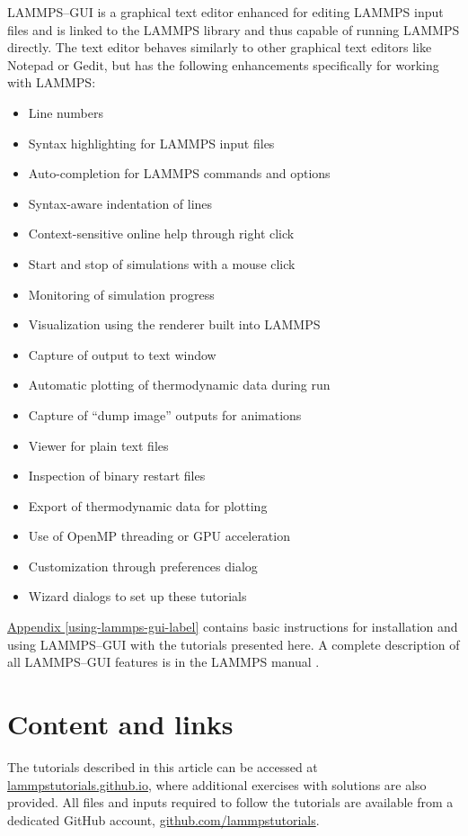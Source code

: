 \documentclass[9pt,tutorial]{livecoms}
\begin{document}
LAMMPS--GUI is a graphical text editor enhanced for editing LAMMPS input
files and is linked to the LAMMPS library and thus capable of running
LAMMPS directly.  The text editor behaves similarly to other graphical
text editors like Notepad or Gedit, but has the following enhancements
specifically for working with LAMMPS:
\begin{itemize}
\item Line numbers
\item Syntax highlighting for LAMMPS input files
\item Auto-completion for LAMMPS commands and options
\item Syntax-aware indentation of lines
\item Context-sensitive online help through right click
\item Start and stop of simulations with a mouse click
\item Monitoring of simulation progress
\item Visualization using the renderer built into LAMMPS
\item Capture of output to text window
\item Automatic plotting of thermodynamic data during run
\item Capture of ``dump image'' outputs for animations
\item Viewer for plain text files
\item Inspection of binary restart files
\item Export of thermodynamic data for plotting
\item Use of OpenMP threading or GPU acceleration
\item Customization through preferences dialog
\item Wizard dialogs to set up these tutorials
\end{itemize}

\hyperref[using-lammps-gui-label]{Appendix \ref{using-lammps-gui-label}}
contains basic instructions for installation and using LAMMPS--GUI with
the tutorials presented here.  A complete description of all LAMMPS--GUI
features is in the LAMMPS manual \cite{lammps_gui_docs}.

\section{Content and links}

The tutorials described in this article can be accessed at
\href{https://lammpstutorials.github.io}{lammpstutorials.github.io},
where additional exercises with solutions are also provided. All files
and inputs required to follow the tutorials are available from a
dedicated GitHub account,
\href{https://github.com/lammpstutorials}{github.com/lammpstutorials}.
\end{document}
